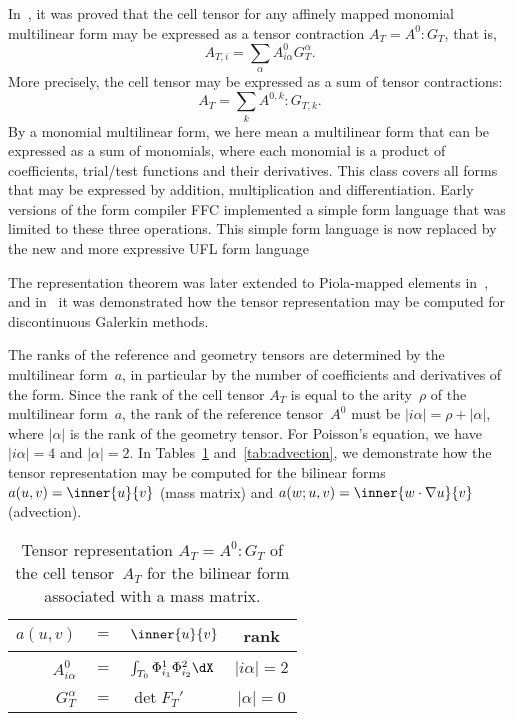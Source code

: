 In~\cite{KirbyLogg2006}, it was proved that the cell tensor for any
affinely mapped monomial multilinear form may be expressed as a tensor
contraction $A_T = A^0 : G_T$, that is,
\begin{equation*}
  A_{T,i} = \sum_{\alpha} A^0_{i\alpha} G_T^{\alpha}.
\end{equation*}
More precisely, the cell tensor may be expressed as a sum of tensor
contractions:
\begin{equation} \label{eq:tensorcontraction}
  A_T = \sum_k A^{0,k} : G_{T,k}.
\end{equation}
By a monomial multilinear form, we here mean a multilinear form that
can be expressed as a sum of monomials, where each monomial is a
product of coefficients, trial/test functions and their derivatives.
This class covers all forms that may be expressed by addition,
multiplication and differentiation. Early versions of the form
compiler FFC implemented a simple form language that was limited to
these three operations. This simple form language is now replaced by
the new and more expressive UFL form language

The representation theorem was later extended to Piola-mapped elements
in~\cite{RognesKirbyLogg2009}, and in~\cite{OelgaardLoggWells2008} it was
demonstrated how the tensor representation may be computed for
discontinuous Galerkin methods.

The ranks of the reference and geometry tensors are determined by the
multilinear form~$a$, in particular by the number of coefficients and
derivatives of the form. Since the rank of the cell tensor $A_T$ is
equal to the arity~$\rho$ of the multilinear form~$a$, the rank of the
reference tensor~$A^0$ must be $|i\alpha| = \rho + |\alpha|$, where
$|\alpha|$ is the rank of the geometry tensor. For Poisson's equation,
we have $|i\alpha| = 4$ and $|\alpha| = 2$. In Tables~\ref{tab:mass}
and~\ref{tab:advection}, we demonstrate how the tensor representation
may be computed for the bilinear forms $a(u, v) = \inner{u}{v}$ (mass
matrix) and $a(w; u, v) = \inner{w \cdot \nabla u}{v}$ (advection).

\begin{table}
  \begin{center}
    \begin{tabular}{|rcl|c|}
      \hline
      $a(u, v)$ &$=$& $\inner{u}{v}$ & rank \\
      \hline
      \hline
      &&&\\[-2ex]
      $A^0_{i\alpha}$ &$=$& $\int_{T_0} \Phi_{i_1}^{1} \Phi_{i_2}^{2} \dX$
      & $|i\alpha| = 2$ \\[1ex]
      \hline
      &&&\\[-2ex]
      $G_T^{\alpha}$ &$=$& $\det F_T'$
      & $|\alpha| = 0$ \\[1ex]
      \hline
    \end{tabular}
    \caption{Tensor representation $A_T = A^0 : G_T$ of the cell
      tensor~$A_T$ for the bilinear form associated with a mass
      matrix.}
    \label{tab:mass}
  \end{center}
\end{table}

